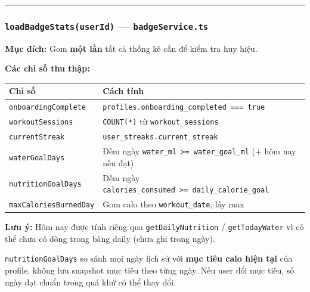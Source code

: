 \documentclass[12pt,a4paper]{article}
\newcounter{none}
\begin{document}
\begin{center}\rule{0.5\linewidth}{0.5pt}\end{center}

\subsubsection{\texorpdfstring{\texttt{loadBadgeStats(userId)} ---
\texttt{badgeService.ts}}{loadBadgeStats(userId) --- badgeService.ts}}\label{loadbadgestatsuserid-badgeservice.ts}

\textbf{Mục đích:} Gom \textbf{một lần} tất cả thống kê cần để kiểm tra
huy hiệu.

\textbf{Các chỉ số thu thập:}

{\def\LTcaptype{none} %
\begin{longtable}[]{@{}
  >{\raggedright\arraybackslash}p{}
  >{\raggedright\arraybackslash}p{}@{}}
\toprule\noalign{}
\begin{minipage}[b]{\linewidth}\raggedright
Chỉ số
\end{minipage} & \begin{minipage}[b]{\linewidth}\raggedright
Cách tính
\end{minipage} \\
\midrule\noalign{}
\endhead
\bottomrule\noalign{}
\endlastfoot
\texttt{onboardingComplete} &
\texttt{profiles.onboarding\_completed\ ===\ true} \\
\texttt{workoutSessions} & \texttt{COUNT(*)} từ
\texttt{workout\_sessions} \\
\texttt{currentStreak} & \texttt{user\_streaks.current\_streak} \\
\texttt{waterGoalDays} & Đếm ngày
\texttt{water\_ml\ \textgreater{}=\ water\_goal\_ml} (+ hôm nay nếu
đạt) \\
\texttt{nutritionGoalDays} & Đếm ngày
\texttt{calories\_consumed\ \textgreater{}=\ daily\_calorie\_goal} \\
\texttt{maxCaloriesBurnedDay} & Gom calo theo \texttt{workout\_date},
lấy max \\
\end{longtable}
}

\textbf{Lưu ý:} Hôm nay được tính riêng qua \texttt{getDailyNutrition} /
\texttt{getTodayWater} vì có thể chưa có dòng trong bảng daily (chưa ghi
trong ngày).

\texttt{nutritionGoalDays} so sánh mọi ngày lịch sử với \textbf{mục tiêu
calo hiện tại} của profile, không lưu snapshot mục tiêu theo từng ngày.
Nếu user đổi mục tiêu, số ngày đạt chuẩn trong quá khứ có thể thay đổi.
\end{document}

